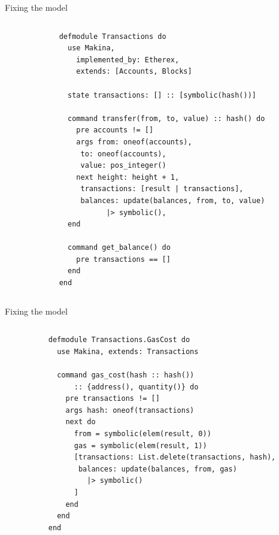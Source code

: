 \documentclass[aspectratio=169, 10pt, handout]{beamer}
\begin{document}
\begin{frame}[label={sec:org897a3f9},fragile]{Fixing the model}
 \begin{columns}
\begin{column}{0.44\columnwidth}
\end{column}

\begin{column}{0.52\columnwidth}
\onslide<+->
\vspace{-10pt}
\lstset{language=elixir,label= ,caption= ,captionpos=b,numbers=none,style=display}
\begin{lstlisting}
defmodule Transactions do
  use Makina,
    implemented_by: Etherex,
    extends: [Accounts, Blocks]

  state transactions: [] :: [symbolic(hash())]

  command transfer(from, to, value) :: hash() do
    pre accounts != []
    args from: oneof(accounts),
	 to: oneof(accounts),
	 value: pos_integer()
    next height: height + 1,
	 transactions: [result | transactions],
	 balances: update(balances, from, to, value)
		   |> symbolic(),
  end

  command get_balance() do
    pre transactions == []
  end
end
\end{lstlisting}
\end{column}
\end{columns}
\end{frame}

\begin{frame}[label={sec:org46c24a6},fragile]{Fixing the model}
 \begin{columns}
\begin{column}{0.44\columnwidth}
\end{column}

\begin{column}{0.52\columnwidth}
\lstset{language=elixir,label= ,caption= ,captionpos=b,numbers=none,style=display}
\begin{lstlisting}
defmodule Transactions.GasCost do
  use Makina, extends: Transactions

  command gas_cost(hash :: hash())
      :: {address(), quantity()} do
    pre transactions != []
    args hash: oneof(transactions)
    next do
      from = symbolic(elem(result, 0))
      gas = symbolic(elem(result, 1))
      [transactions: List.delete(transactions, hash),
       balances: update(balances, from, gas)
		 |> symbolic()
      ]
    end
  end
end
\end{lstlisting}
\end{column}
\end{columns}
\end{frame}
\end{document}
